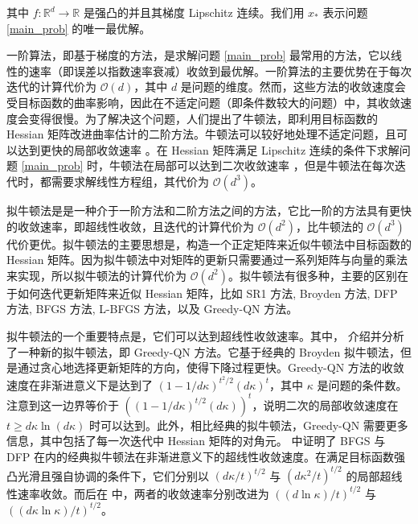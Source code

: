 \documentclass[a4paper,twoside,AutoFakeBold]{article}
\theoremstyle{definition}
\begin{document}
其中 $f:\mathbb{R}^d\to \mathbb{R}$ 是强凸的并且其梯度 Lipschitz 连续。我们用 $x_*$ 表示问题 \eqref{main_prob} 的唯一最优解。

一阶算法，即基于梯度的方法，是求解问题 \eqref{main_prob} 最常用的方法，它以线性的速率（即误差以指数速率衰减）收敛到最优解。一阶算法的主要优势在于每次迭代的计算代价为 $\mathcal{O}(d)$，其中 $d$ 是问题的维度。然而，这些方法的收敛速度会受目标函数的曲率影响，因此在不适定问题（即条件数较大的问题）中，其收敛速度会变得很慢。为了解决这个问题，人们提出了牛顿法，即利用目标函数的 Hessian 矩阵改进曲率估计的二阶方法。牛顿法可以较好地处理不适定问题，且可以达到更快的局部收敛速率 \cite{bennett1916newton}\cite{ortega1970iterative}\cite{conn2000trust}\cite{nesterov2006cubic}。在 Hessian 矩阵满足 Lipschitz 连续的条件下求解问题 \eqref{main_prob} 时，牛顿法在局部可以达到二次收敛速率 \cite[Chapter 9]{boyd2004convex}，但是牛顿法在每次迭代时，都需要求解线性方程组，其代价为 $\mathcal{O}(d^3)$。

拟牛顿法是是一种介于一阶方法和二阶方法之间的方法，它比一阶的方法具有更快的收敛速率，即超线性收敛，且迭代的计算代价为 $\mathcal{O}(d^2)$，比牛顿法的 $\mathcal{O}(d^3)$ 代价更优。拟牛顿法的主要思想是，构造一个正定矩阵来近似牛顿法中目标函数的 Hessian 矩阵。因为拟牛顿法中对矩阵的更新只需要通过一系列矩阵与向量的乘法来实现，所以拟牛顿法的计算代价为 $\mathcal{O}(d^2)$。拟牛顿法有很多种，主要的区别在于如何迭代更新矩阵来近似 Hessian 矩阵，比如 SR1 方法\cite{conn1991convergence}, Broyden 方法\cite{broyden1965class}\cite{broyden1973quasi}\cite{gay1979some}, DFP 方法\cite{davidon1959variable}\cite{fletcher1963rapidly}, BFGS 方法\cite{broyden1970convergence}\cite{fletcher1970new}\cite{goldfarb1970family}\cite{shanno1970conditioning}, L-BFGS 方法\cite{nocedal1980updating}\cite{DingNocedal}，以及 Greedy-QN 方法\cite{rodomanov2020greedy}。

拟牛顿法的一个重要特点是，它们可以达到超线性收敛速率。其中，\citet{rodomanov2020greedy} 介绍并分析了一种新的拟牛顿法，即 Greedy-QN 方法。它基于经典的 Broyden 拟牛顿法，但是通过贪心地选择更新矩阵的方向，使得下降过程更快。Greedy-QN 方法的收敛速度在非渐进意义下是达到了 $(1 - {1}/{d\kappa})^{t^2/2}(d\kappa)^t$，其中 $\kappa$ 是问题的条件数。注意到这一边界等价于 $((1 - {1}/{d\kappa})^{t/2}(d\kappa))^t$，说明二次的局部收敛速度在 $t\geq d\kappa \ln (d\kappa)$ 时可以达到。此外，相比经典的拟牛顿法，Greedy-QN 需要更多信息，其中包括了每一次迭代中 Hessian 矩阵的对角元。\citet{rodomanov2020rates} 中证明了 BFGS 与 DFP 在内的经典拟牛顿法在非渐进意义下的超线性收敛速度。在满足目标函数强凸光滑且强自协调的条件下，它们分别以 $({d\kappa}/{t})^{t/2}$ 与 $({d\kappa^2}/{t})^{t/2}$ 的局部超线性速率收敛。而后在 \citet{rodomanov2020ratesnew} 中，两者的收敛速率分别改进为 $({(d\ln{\kappa})}/{t})^{{t}/{2}}$ 与 $({(d\kappa\ln{\kappa})}/{t})^{{t}/{2}}$。
\end{document}
